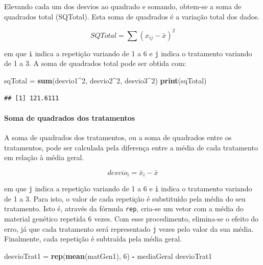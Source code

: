 \documentclass[
]{article}
\newenvironment{Shaded}{\begin{snugshade}}{\end{snugshade}}
\newcommand{\DecValTok}[1]{\textcolor[rgb]{0.00,0.00,0.81}{#1}}
\newcommand{\KeywordTok}[1]{\textcolor[rgb]{0.13,0.29,0.53}{\textbf{#1}}}
\newcommand{\NormalTok}[1]{#1}
\newcommand{\OperatorTok}[1]{\textcolor[rgb]{0.81,0.36,0.00}{\textbf{#1}}}
\newcommand{\StringTok}[1]{\textcolor[rgb]{0.31,0.60,0.02}{#1}}
\begin{document}
Elevando cada um dos desvios ao quadrado e somando, obtem-se a soma de quadrados total (SQTotal). Esta soma de quadrados é a variação total dos dados.

\[SQTotal = \sum (x_{ij} - \bar{x})^2\]

em que \texttt{i} indica a repetição variando de 1 a 6 e \texttt{j} indica o tratamento variando de 1 a 3. A soma de quadrados total pode ser obtida com:

\begin{Shaded}
\begin{Highlighting}[]
\NormalTok{sqTotal =}\StringTok{ }\KeywordTok{sum}\NormalTok{(desvio1}\OperatorTok{^}\DecValTok{2}\NormalTok{, desvio2}\OperatorTok{^}\DecValTok{2}\NormalTok{, desvio3}\OperatorTok{^}\DecValTok{2}\NormalTok{)}
\KeywordTok{print}\NormalTok{(sqTotal)}
\end{Highlighting}
\end{Shaded}

\begin{verbatim}
## [1] 121.6111
\end{verbatim}

\hypertarget{soma-de-quadrados-dos-tratamentos}{%
\paragraph{Soma de quadrados dos tratamentos}\label{soma-de-quadrados-dos-tratamentos}}

A soma de quadrados dos tratamentos, ou a soma de quadrados entre os tratamentos, pode ser calculada pela diferença entre a média de cada tratamento em relação à média geral.

\[desvio_{i} = \bar{x}_{i} - \bar{x}\]

em que \texttt{j} indica a repetição variando de 1 a 6 e \texttt{i} indica o tratamento variando de 1 a 3. Para isto, o valor de cada repetição é substituído pela média do seu tratamento. Isto é, através da fórmula \texttt{rep}, cria-se um vetor com a média do material genético repetida 6 vezes. Com esse procedimento, elimina-se o efeito do erro, já que cada tratamento será representado \texttt{j} vezes pelo valor da sua média. Finalmente, cada repetição é subtraída pela média geral.

\begin{Shaded}
\begin{Highlighting}[]
\NormalTok{desvioTrat1 =}\StringTok{ }\KeywordTok{rep}\NormalTok{(}\KeywordTok{mean}\NormalTok{(matGen1), }\DecValTok{6}\NormalTok{) }\OperatorTok{-}\StringTok{ }\NormalTok{mediaGeral}
\NormalTok{desvioTrat1}
\end{Highlighting}
\end{Shaded}
\end{document}
